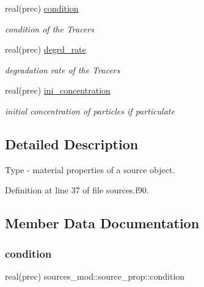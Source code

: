 \begin{DoxyCompactItemize}
real(prec) \mbox{\hyperlink{structsources__mod_1_1source__prop_a0276a57d6c2ebd9f6ce2c5c780b00b2f}{condition}}
\begin{DoxyCompactList}\small\item\em condition of the Tracers \end{DoxyCompactList}\item 
real(prec) \mbox{\hyperlink{structsources__mod_1_1source__prop_a6c302a7a21c554720641b4f377489794}{degrd\+\_\+rate}}
\begin{DoxyCompactList}\small\item\em degradation rate of the Tracers \end{DoxyCompactList}\item 
real(prec) \mbox{\hyperlink{structsources__mod_1_1source__prop_a1e3fba85e54d3fbab3b133507ce7e226}{ini\+\_\+concentration}}
\begin{DoxyCompactList}\small\item\em initial concentration of particles if particulate \end{DoxyCompactList}\end{DoxyCompactItemize}


\subsection{Detailed Description}
Type -\/ material properties of a source object. 

Definition at line 37 of file sources.\+f90.



\subsection{Member Data Documentation}
\mbox{\label{structsources__mod_1_1source__prop_a0276a57d6c2ebd9f6ce2c5c780b00b2f}} 
\subsubsection{\texorpdfstring{condition}{condition}}
{\footnotesize\ttfamily real(prec) sources\+\_\+mod\+::source\+\_\+prop\+::condition\hspace{0.3cm}{\ttfamily [private]}}



